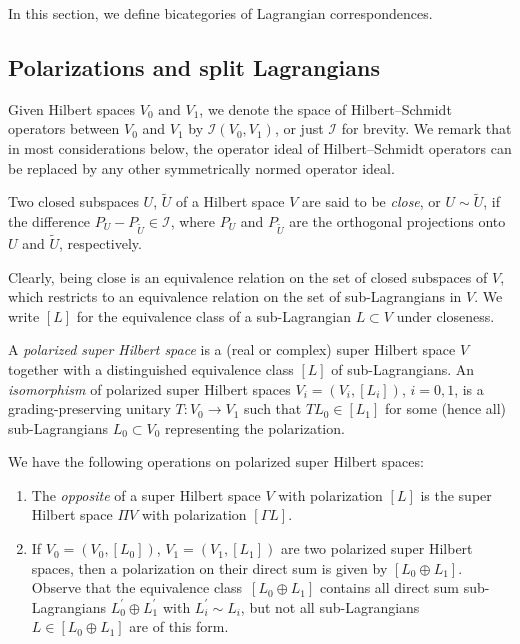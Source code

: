 \documentclass[pdftex]{sigma}
\numberwithin{equation}{section}
\begin{document}
In this section, we define bicategories of Lagrangian correspondences.

\subsection{Polarizations and split Lagrangians}\label{SectionPolarizations}

Given Hilbert spaces $V_0$ and $V_1$, we denote the space of Hilbert--Schmidt operators between $V_0$ and $V_1$ by $\mathcal{I}(V_0, V_1)$, or just $\mathcal{I}$ for brevity.
We remark that in most considerations below, the operator ideal of Hilbert--Schmidt operators can be replaced by any other symmetrically normed operator ideal.

\begin{Definition}
Two closed subspaces $U$, $\tilde{U}$ of a Hilbert space $V$ are said to be {\em close}, or $U \sim \tilde{U}$, if the difference $P_{U} - P_{\tilde{U}} \in \mathcal{I}$, where $P_{U}$ and $P_{\tilde{U}}$ are the orthogonal projections onto $U$ and $\tilde{U}$, respectively.
\end{Definition}

Clearly, being close is an equivalence relation on the set of closed subspaces of $V$, which restricts to an equivalence relation on the set of sub-Lagrangians in $V$.
We write $[L]$ for the equivalence class of a sub-Lagrangian $L \subset V$ under closeness.

\begin{Definition}
A {\em polarized super Hilbert space} is a (real or complex) super Hilbert space $V$ together with a distinguished equivalence class $[L]$ of sub-Lagrangians.
An {\em isomorphism} of polarized super Hilbert spaces $V_i = (V_i, [L_i])$, $i=0, 1$, is a grading-preserving unitary $T\colon V_0 \to V_1$ such that $TL_0 \in [L_1]$ for some (hence all) sub-Lagrangians $L_0 \subset V_0$ representing the polarization.
\end{Definition}


\begin{Example} \label{ExamplePolarizedHilbertSpace}
We have the following operations on polarized super Hilbert spaces:
\begin{enumerate}\itemsep=0pt
\item[(a)] The {\em opposite} of a super Hilbert space $V$ with polarization $[L]$ is the super Hilbert space $\Pi V$ with polarization $[\Gamma L]$.
\item[(b)] If $V_0 = (V_0, [L_0])$, $V_1 = (V_1, [L_1])$ are two polarized super Hilbert spaces, then a polarization on their direct sum is given by $[L_0 \oplus L_1]$.
Observe that the equivalence class~${[L_0 \oplus L_1]}$ contains all direct sum sub-Lagrangians $L_0^\prime \oplus L_1^\prime$ with $L_i^\prime \sim L_i$, but not all sub-Lagrangians ${L \in [L_0 \oplus L_1]}$ are of this form.
\end{enumerate}
\end{Example}
\end{document}
